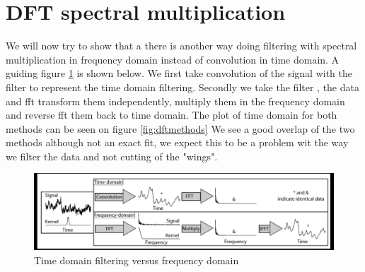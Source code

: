 \section{DFT spectral multiplication}
We will now try to show that a there is another way doing filtering with spectral multiplication in frequency domain instead of convolution in time domain. A guiding figure \ref{fig:DFTTeori} is shown below.
We first take convolution of the signal with the filter to represent the time domain filtering. Secondly we take the filter , the data and fft transform them independently, multiply them in the frequency domain and reverse fft them back to time domain.
The plot of time domain for both methods can be seen on figure \ref{fig:dftmethods}
We see a good overlap of the two methods although not an exact fit, we expect this to be a problem wit the way we filter the data and not cutting of the "wings".

\begin{figure}[h]
  \centering
  \includegraphics[width=\textwidth]{matlabstuff/covmulti.png}
  \caption{Time domain filtering versus frequency domain}%
  \label{fig:DFTTeori}
\end{figure}


